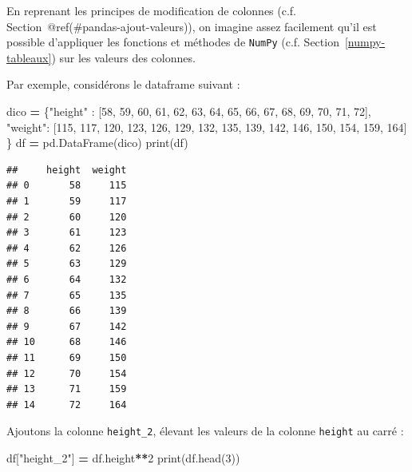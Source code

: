 \documentclass[
  12pt,
]{book}
\newenvironment{Shaded}{\begin{snugshade}}{\end{snugshade}}
\newcommand{\BuiltInTok}[1]{#1}
\newcommand{\DecValTok}[1]{\textcolor[rgb]{0.00,0.00,0.81}{#1}}
\newcommand{\NormalTok}[1]{#1}
\newcommand{\OperatorTok}[1]{\textcolor[rgb]{0.81,0.36,0.00}{\textbf{#1}}}
\newcommand{\StringTok}[1]{\textcolor[rgb]{0.31,0.60,0.02}{#1}}
\numberwithin{equation}{section}
\numberwithin{countremarque}{section}
\begin{document}
En reprenant les principes de modification de colonnes (c.f. Section~@ref(\#pandas-ajout-valeurs)), on imagine assez facilement qu'il est possible d'appliquer les fonctions et méthodes de \texttt{NumPy} (c.f. Section~\ref{numpy-tableaux}) sur les valeurs des colonnes.

Par exemple, considérons le dataframe suivant :

\begin{Shaded}
\begin{Highlighting}[]
\NormalTok{dico }\OperatorTok{=}\NormalTok{ \{}\StringTok{"height"}\NormalTok{ : }
\NormalTok{               [}\DecValTok{58}\NormalTok{, }\DecValTok{59}\NormalTok{, }\DecValTok{60}\NormalTok{, }\DecValTok{61}\NormalTok{, }\DecValTok{62}\NormalTok{,}
                \DecValTok{63}\NormalTok{, }\DecValTok{64}\NormalTok{, }\DecValTok{65}\NormalTok{, }\DecValTok{66}\NormalTok{, }\DecValTok{67}\NormalTok{,}
                \DecValTok{68}\NormalTok{, }\DecValTok{69}\NormalTok{, }\DecValTok{70}\NormalTok{, }\DecValTok{71}\NormalTok{, }\DecValTok{72}\NormalTok{],}
        \StringTok{"weight"}\NormalTok{: }
\NormalTok{               [}\DecValTok{115}\NormalTok{, }\DecValTok{117}\NormalTok{, }\DecValTok{120}\NormalTok{, }\DecValTok{123}\NormalTok{, }\DecValTok{126}\NormalTok{,}
                \DecValTok{129}\NormalTok{, }\DecValTok{132}\NormalTok{, }\DecValTok{135}\NormalTok{, }\DecValTok{139}\NormalTok{, }\DecValTok{142}\NormalTok{,}
                \DecValTok{146}\NormalTok{, }\DecValTok{150}\NormalTok{, }\DecValTok{154}\NormalTok{, }\DecValTok{159}\NormalTok{, }\DecValTok{164}\NormalTok{]}
\NormalTok{       \} }
\NormalTok{df }\OperatorTok{=}\NormalTok{ pd.DataFrame(dico)}
\BuiltInTok{print}\NormalTok{(df)}
\end{Highlighting}
\end{Shaded}

\begin{lstlisting}
##     height  weight
## 0       58     115
## 1       59     117
## 2       60     120
## 3       61     123
## 4       62     126
## 5       63     129
## 6       64     132
## 7       65     135
## 8       66     139
## 9       67     142
## 10      68     146
## 11      69     150
## 12      70     154
## 13      71     159
## 14      72     164
\end{lstlisting}

Ajoutons la colonne \texttt{height\_2}, élevant les valeurs de la colonne \texttt{height} au carré :

\begin{Shaded}
\begin{Highlighting}[]
\NormalTok{df[}\StringTok{"height\_2"}\NormalTok{] }\OperatorTok{=}\NormalTok{ df.height}\OperatorTok{**}\DecValTok{2}
\BuiltInTok{print}\NormalTok{(df.head(}\DecValTok{3}\NormalTok{))}
\end{Highlighting}
\end{Shaded}
\end{document}
